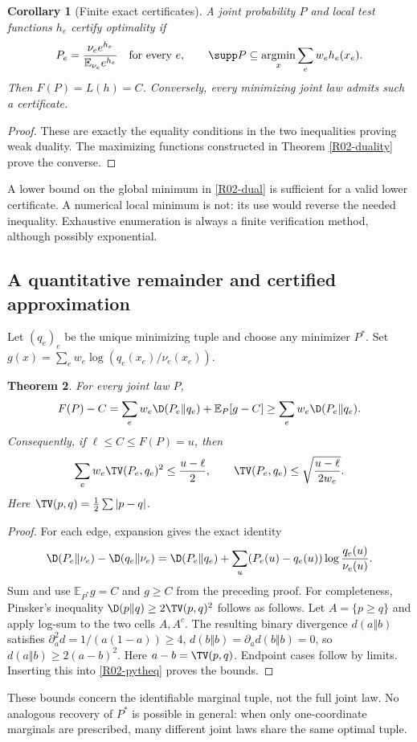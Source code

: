 \documentclass[11pt,a4paper]{article}
\newtheorem{theorem}{Theorem}[section]
\newtheorem{corollary}[theorem]{Corollary}
\theoremstyle{definition}\newtheorem{definition}[theorem]{Definition}
\theoremstyle{remark}\newtheorem{remark}[theorem]{Remark}
\newcommand{\E}{\mathbb E}\newcommand{\one}{\mathbf 1}\newcommand{\1}{\mathbf 1}
\DeclareMathOperator*{\argmin}{argmin}\DeclareMathOperator{\conv}{conv}
\numberwithin{equation}{section}
\begin{document}
\begin{corollary}[Finite exact certificates]\label{R02-cert}
A joint probability $P$ and local test functions $h_e$ certify optimality if
\[
P_e=\frac{\nu_e e^{h_e}}{\E_{\nu_e}e^{h_e}}\quad\text{for every }e,
\qquad
\supp P\subseteq\argmin_x\sum_e w_eh_e(x_e).
\]
Then $F(P)=L(h)=C$. Conversely, every minimizing joint law admits such a certificate.
\end{corollary}
\begin{proof}
These are exactly the equality conditions in the two inequalities proving weak duality. The maximizing functions constructed in Theorem \ref{R02-duality} prove the converse.
\end{proof}
A lower bound on the global minimum in \eqref{R02-dual} is sufficient for a valid lower certificate. A numerical local minimum is not: its use would reverse the needed inequality. Exhaustive enumeration is always a finite verification method, although possibly exponential.

\subsection{A quantitative remainder and certified approximation}\label{R02-sec-3}
Let $(q_e)_e$ be the unique minimizing tuple and choose any minimizer $P^*$. Set $g(x)=\sum_e w_e\log(q_e(x_e)/\nu_e(x_e))$.
\begin{theorem}\label{R02-pyth}
For every joint law $P$,
\begin{equation}\label{R02-pytheq}
F(P)-C=\sum_e w_e\D(P_e\Vert q_e)+\E_P[g-C]
\geq\sum_e w_e\D(P_e\Vert q_e).
\end{equation}
Consequently, if $\ell\leq C\leq F(P)=u$, then
\[
\sum_e w_e\TV(P_e,q_e)^2\leq\frac{u-\ell}{2},\qquad
\TV(P_e,q_e)\leq\sqrt{\frac{u-\ell}{2w_e}}.
\]
Here $\TV(p,q)=\frac12\sum|p-q|$.
\end{theorem}
\begin{proof}
For each edge, expansion gives the exact identity
\[
\D(P_e\Vert\nu_e)-\D(q_e\Vert\nu_e)
=\D(P_e\Vert q_e)+\sum_u(P_e(u)-q_e(u))\log\frac{q_e(u)}{\nu_e(u)}.
\]
Sum and use $\E_{P^*}g=C$ and $g\geq C$ from the preceding proof. For completeness, Pinsker's inequality $\D(p\Vert q)\geq2\TV(p,q)^2$ follows as follows. Let $A=\{p\geq q\}$ and apply log-sum to the two cells $A,A^c$. The resulting binary divergence $d(a\Vert b)$ satisfies $\partial_a^2d=1/(a(1-a))\geq4$, $d(b\Vert b)=\partial_ad(b\Vert b)=0$, so $d(a\Vert b)\geq2(a-b)^2$. Here $a-b=\TV(p,q)$. Endpoint cases follow by limits. Inserting this into \eqref{R02-pytheq} proves the bounds.
\end{proof}
These bounds concern the identifiable marginal tuple, not the full joint law. No analogous recovery of $P^*$ is possible in general: when only one-coordinate marginals are prescribed, many different joint laws share the same optimal tuple.
\end{document}
